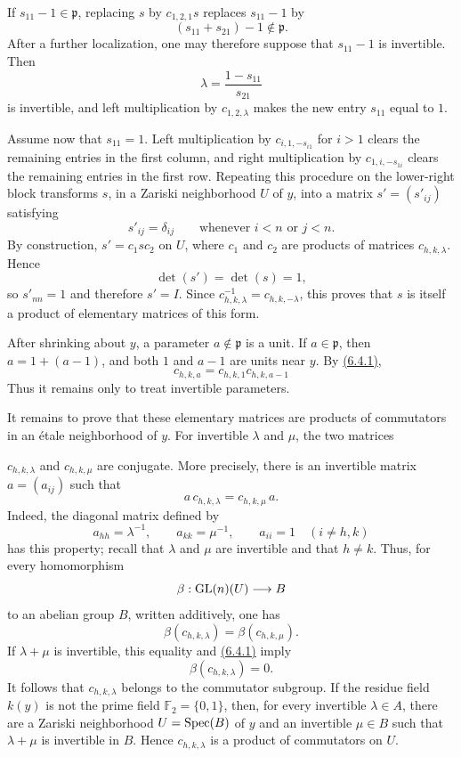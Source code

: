 If $s_{11}-1\in\mathfrak p$, replacing $s$ by $c_{1,2,1}s$ replaces
$s_{11}-1$ by
\[
(s_{11}+s_{21})-1\notin\mathfrak p.
\]
After a further localization, one may therefore suppose that $s_{11}-1$ is
invertible. Then
\[
\lambda=\frac{1-s_{11}}{s_{21}}
\]
is invertible, and left multiplication by $c_{1,2,\lambda}$ makes the new
entry $s_{11}$ equal to $1$.

Assume now that $s_{11}=1$. Left multiplication by
$c_{i,1,-s_{i1}}$ for $i>1$ clears the remaining entries in the first
column, and right multiplication by $c_{1,i,-s_{1i}}$ clears the remaining
entries in the first row. Repeating this procedure on the lower-right block
transforms $s$, in a Zariski neighborhood $U$ of $y$, into a matrix
$s'=(s'_{ij})$ satisfying
\[
s'_{ij}=\delta_{ij}\qquad\text{whenever }i<n\text{ or }j<n.
\]
By construction, $s'=c_1sc_2$ on $U$, where $c_1$ and $c_2$ are products
of matrices $c_{h,k,\lambda}$. Hence
\[
\det(s')=\det(s)=1,
\]
so $s'_{nn}=1$ and therefore $s'=I$. Since
$c_{h,k,\lambda}^{-1}=c_{h,k,-\lambda}$, this proves that $s$ is itself a
product of elementary matrices of this form.

After shrinking about $y$, a parameter $a\notin\mathfrak p$ is a unit. If
$a\in\mathfrak p$, then $a=1+(a-1)$, and both $1$ and $a-1$ are units near
$y$. By \hyperlink{sga6.e10.eq.6-4-1}{(6.4.1)},
\[
c_{h,k,a}=c_{h,k,1}c_{h,k,a-1}
\]
Thus it remains only to treat invertible parameters.

It remains to prove that these elementary matrices are products of
commutators in an \'etale neighborhood of $y$. For invertible $\lambda$ and
$\mu$, the two matrices

$c_{h,k,\lambda}$ and $c_{h,k,\mu}$ are conjugate. More precisely, there is
an invertible matrix $a=(a_{ij})$ such that
\[
a\,c_{h,k,\lambda}=c_{h,k,\mu}\,a.
\]
Indeed, the diagonal matrix defined by
\[
a_{hh}=\lambda^{-1},\qquad a_{kk}=\mu^{-1},\qquad
a_{ii}=1\quad(i\ne h,k)
\]
has this property; recall that $\lambda$ and $\mu$ are invertible and that
$h\ne k$. Thus, for every homomorphism
\[
\beta:\operatorname{GL}(n)(U)\longrightarrow B
\]
to an abelian group $B$, written additively, one has
\[
\beta(c_{h,k,\lambda})=\beta(c_{h,k,\mu}).
\]
If $\lambda+\mu$ is invertible, this equality and \hyperlink{sga6.e10.eq.6-4-1}{(6.4.1)} imply
\[
\beta(c_{h,k,\lambda})=0.
\]
It follows that $c_{h,k,\lambda}$ belongs to the commutator subgroup. If the
residue field $k(y)$ is not the prime field $\mathbb F_2=\{0,1\}$, then,
for every invertible $\lambda\in A$, there are a Zariski neighborhood
$U=\operatorname{Spec}(B)$ of $y$ and an invertible $\mu\in B$ such that
$\lambda+\mu$ is invertible in $B$. Hence $c_{h,k,\lambda}$ is a product
of commutators on $U$.

